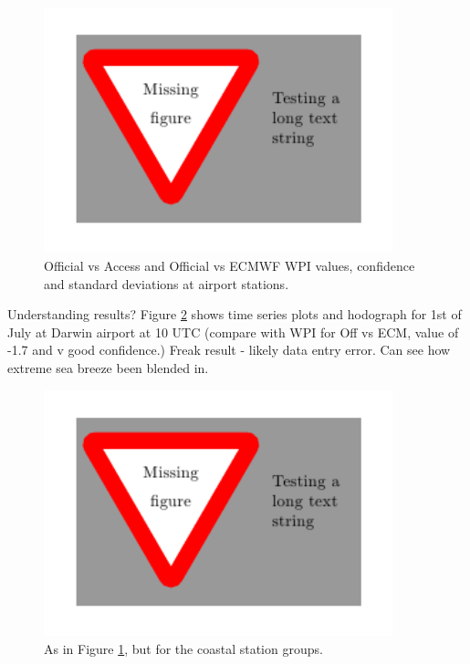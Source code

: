 \documentclass[alpha-refs]{wiley-article}
\begin{document}
\begin{figure}
\centering
\includegraphics[keepaspectratio=true,width=0.90\textwidth]{figure_placeholder.png}
\caption{Official vs Access and Official vs ECMWF WPI values, confidence and standard deviations at airport stations.}
\label{Fig:airport_wpi}
\end{figure}

Understanding results? Figure \ref{Fig:time_series_and_hodo} shows time series plots and hodograph for 1st of July at Darwin airport at 10 UTC (compare with WPI for Off vs ECM, value of -1.7 and v good confidence.) Freak result - likely data entry error. Can see how extreme sea breeze been blended in.

\begin{figure}
\centering
\includegraphics[keepaspectratio=true,width=0.90\textwidth]{figure_placeholder.png}
\caption{As in Figure \ref{Fig:airport_wpi}, but for the coastal station groups.}
\label{Fig:time_series_and_hodo}
\end{figure}
\end{document}
